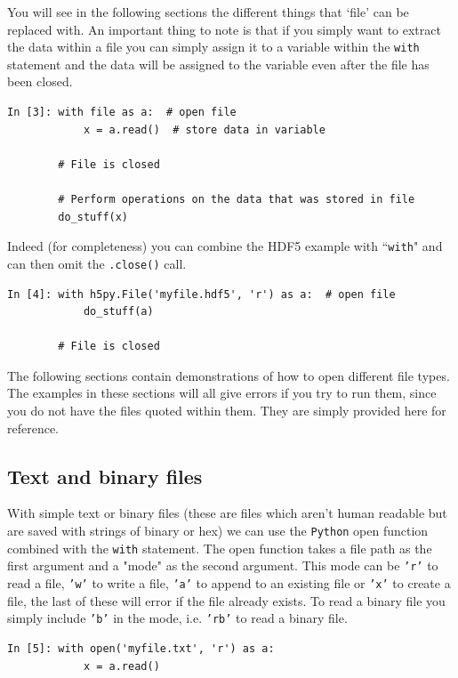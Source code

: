 You will see in the following sections the different things that `file' can be replaced with. An important thing to note is that if you simply want to extract the data within a file you can simply assign it to a variable within the {\tt with} statement and the data will be assigned to the variable even after the file has been closed.

\begin{lstlisting}[style=PY]
In [3]: with file as a:  # open file
            x = a.read()  # store data in variable 
        
        # File is closed
        
        # Perform operations on the data that was stored in file
        do_stuff(x)
\end{lstlisting}

Indeed (for completeness) you can combine the HDF5 example with ``\texttt{with}" and can then omit the \texttt{.close()} call.

\begin{lstlisting}[style=PY]
In [4]: with h5py.File('myfile.hdf5', 'r') as a:  # open file
            do_stuff(a) 
        
        # File is closed
\end{lstlisting}

The following sections contain demonstrations of how to open different file types. The examples in these sections will all give errors if you try to run them, since you do not have the files quoted within them.  They are simply provided here for reference.

\subsection{Text and binary files}

With simple text or binary files (these are files which aren't human readable but are saved with strings of binary or hex) we can use the \texttt{Python} open function combined with the \texttt{with} statement. The open function takes a file path as the first argument and a "mode" as the second argument. This mode can be \texttt{'r'} to read a file, \texttt{'w'} to write a file, \texttt{'a'} to append to an existing file or \texttt{'x'} to create a file, the last of these will error if the file already exists. To read a binary file you simply include \texttt{'b'} in the mode, i.e. \texttt{'rb'} to read a binary file.  

\begin{lstlisting}[style=PY]
In [5]: with open('myfile.txt', 'r') as a:
            x = a.read()
\end{lstlisting}

